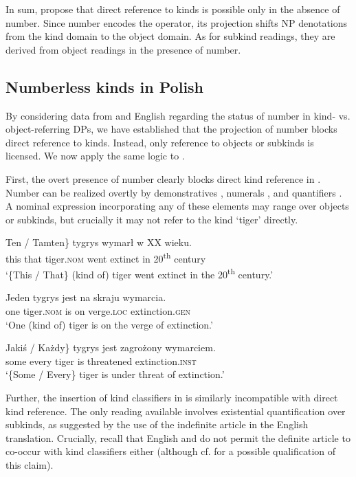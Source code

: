 \documentclass[output=paper]{langscibook}
\begin{document}
\noindent
In sum, \citeauthor{Borik.Espinal2012} propose that direct reference to kinds is possible only in the absence of number. Since number encodes the  operator, its projection shifts NP denotations from the kind domain to the object domain. As for subkind readings, they are derived from object readings in the presence of number.


\subsection{Numberless kinds in Polish} \label{sec:numberless_kinds_pol}

By considering data from  and English regarding the status of number in kind- vs. object-referring DPs, we have established that the projection of number blocks direct reference to kinds. Instead, only reference to objects or subkinds is licensed.
We now apply the same logic to .

First, the overt presence of number clearly blocks direct kind reference in . Number can be realized overtly by demonstratives , numerals , and quantifiers . A nominal expression incorporating any of these elements may range over objects or subkinds, but crucially it may not refer to the kind `tiger' directly.

\ea \label{ex:tiger}
\ea \gll
\minsp{\{} Ten / Tamten\} tygrys wymarł w XX wieku.\\
{} this {} that tiger.\textsc{nom} {went extinct} in 20\textsuperscript{th} century\\
\glt `\{This / That\} (kind of) tiger went extinct in the 20\textsuperscript{th} century.'
\label{ex:tiger_dem}

\ex \gll
Jeden tygrys jest na skraju wymarcia.\\
one tiger.\textsc{nom} is on verge.\textsc{loc} extinction.\textsc{gen}\\
\glt `One (kind of) tiger is on the verge of extinction.'
\label{ex:tiger_num}

\ex \gll
\minsp{\{} Jakiś / Każdy\} tygrys jest zagrożony wymarciem.\\
{} some {} every tiger is threatened extinction.\textsc{inst}\\
\glt `\{Some / Every\} tiger is under threat of extinction.'
\label{ex:tiger_quant}
\z \z

\noindent
Further, the insertion of kind classifiers in  is similarly incompatible with direct kind reference. The only reading available involves existential quantification over subkinds, as suggested by the use of the indefinite article in the English translation. Crucially, recall that English and  do not permit the definite article to co-occur with kind classifiers either (although cf.  for a possible qualification of this claim).
\end{document}
